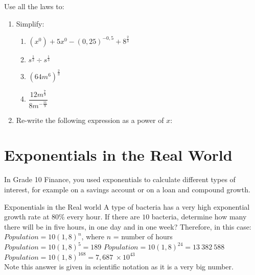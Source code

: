 

{
Use all the laws to:
\begin{enumerate}
\item{Simplify:

\begin{enumerate}
\item$(x^0)+5x^0-(0,25)^{-0,5}+8^{\frac{2}{3}}$ 
\item$s^{\frac{1}{2}}\div s^{\frac{1}{3}}$\\
\item$(64m^6)^\frac{2}{3}$\\
\item $\dfrac{12m^{\frac{7}{9}}}{8m^{-\frac{11}{9}}}$\\

\end{enumerate}
}
\item{Re-write the following expression as a power of $x$:
}
\end{enumerate}
}

\section{Exponentials in the Real World}
In Grade 10 Finance, you used exponentials to calculate different types of interest, for example on a savings account or on a loan and compound growth. 

\begin{wex}{Exponentials in the Real world}
{A type of bacteria has a very high exponential growth rate at $80\%$ every hour. If there are $10$ bacteria, determine how many there will be in five hours, in one day and in one week?}{ 
Therefore, in this case:\\
$Population = 10(1,8)^n$,   where $n$ = number of hours
$Population =10(1,8)^5 = 189$
$Population = 10(1,8)^{24} = 13~382~588$
$Population = 10(1,8)^{168} = 7,687 ~\times 10^{43}$\\
Note this answer is given in scientific notation as it is a very big number.}
\end{wex}

